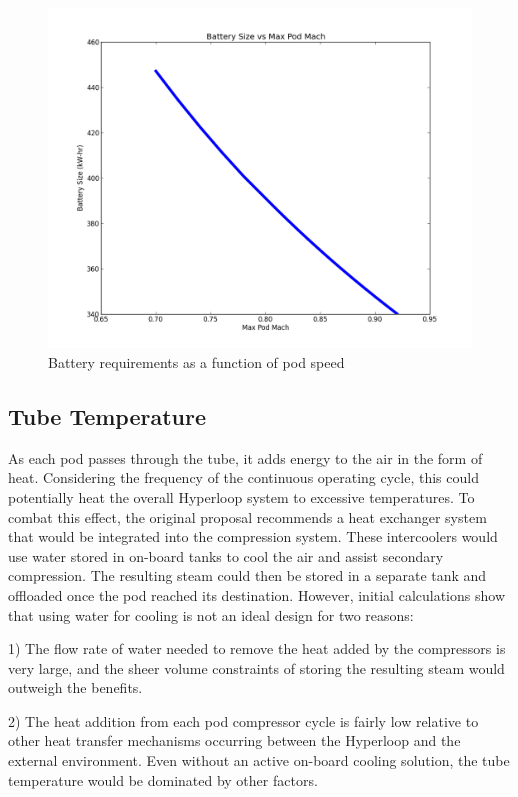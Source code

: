 \documentclass[heading.tex]{subfiles}
\begin{document}
\begin{figure}[H]
\centering
\includegraphics[width=\textwidth]{images/mach_vs_energy.png}
\caption{Battery requirements as a function of pod speed}
\end{figure}

\subsection{Tube Temperature}

As each pod passes through the tube, it adds energy to the air in the form of heat. Considering the frequency of the continuous operating cycle,
this could potentially heat the overall Hyperloop system to excessive temperatures.
To combat this effect, the original proposal recommends a heat exchanger system that would 
be integrated into the compression system. These intercoolers would use water stored in on-board tanks to cool the
air and assist secondary compression. The resulting steam could then be stored in a separate tank and offloaded once the pod reached its destination.
However, initial calculations show that using water for cooling is not an ideal design for two reasons:

1) The flow rate of water needed to remove the heat added by the compressors is very large, and the sheer volume constraints of storing
the resulting steam would outweigh the benefits.

2) The heat addition from each pod compressor cycle is fairly low relative to other heat transfer mechanisms occurring between the Hyperloop
and the external environment. Even without an active on-board cooling solution, the tube temperature would be dominated by other factors.
\end{document}
